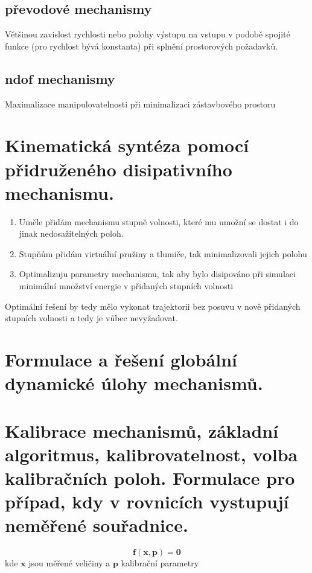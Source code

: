 \documentclass{article}
\begin{document}
	\subsection*{převodové mechanismy}
	Většinou zavislost rychlosti nebo polohy výstupu na vstupu v podobě spojité funkce (pro rychlost bývá konstanta) při splnění prostorových požadavků.

	\subsection*{ndof mechanismy}
	Maximalizace manipulovatelnosti při minimalizaci zástavbového prostoru

	\section{Kinematická syntéza pomocí přidruženého disipativního mechanismu.}
	\begin{enumerate}
		\item Uměle přidám mechanismu stupně volnosti, které mu umožní se dostat i do jinak nedosažitelných poloh.
		\item Stupňům přidám virtuální pružiny a tlumiče, tak minimalizovali jejich polohu
		\item Optimalizuju parametry mechanismu, tak aby bylo disipováno při simulaci minimální množství energie v přidaných stupních volnosti
	\end{enumerate}

	Optimální řešení by tedy mělo vykonat trajektorii bez posuvu v nově přidaných stupních volnosti a tedy je vůbec nevyžadovat.

	\section{Formulace a řešení globální dynamické úlohy mechanismů. }

	\section{Kalibrace mechanismů, základní algoritmus, kalibrovatelnost, volba kalibračních poloh. Formulace pro případ, kdy v rovnicích vystupují neměřené souřadnice.}

	\begin{equation}
		\bm{f}(\bm{x},\bm{p}) = \bm{0}
	\end{equation}
	kde $\bm{x}$ jsou měřené veličiny a $\bm{p}$ kalibrační parametry
\end{document}
